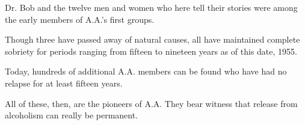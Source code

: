 
\begin{biblechapter}
    Dr. Bob and the twelve men and women who here tell their stories 
    were among the early members of A.A.’s first groups.

\verse Though three have passed away of natural causes, 
    all have maintained complete sobriety 
    for periods ranging from fifteen to nineteen years 
    as of this date, 1955.

\verse Today, hundreds of additional A.A. members can be found 
    who have had no relapse for at least fifteen years.

\verse All of these, then, are the pioneers of A.A. 
\verse They bear witness that 
    release from alcoholism can really be permanent.

\end{biblechapter}
